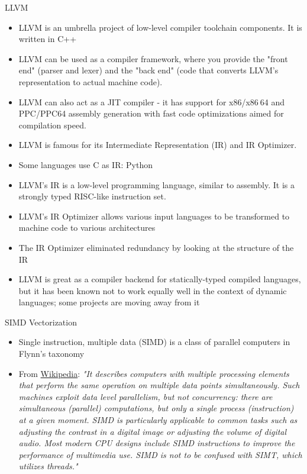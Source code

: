 \documentclass{beamer}
\begin{document}
\begin{darkframes}
\begin{frame}{LLVM}
  \begin{itemize}
  \item LLVM is an umbrella project of low-level compiler toolchain components. It is written in C++  
  \item LLVM can be used as a compiler framework, where you provide the "front end" (parser and lexer) and the "back end" (code that converts LLVM's representation to actual machine code).
  \item LLVM can also act as a JIT compiler - it has support for x86/x86$_{\ }$64 and PPC/PPC64 assembly generation with fast code optimizations aimed for compilation speed.
  \item LLVM is famous for its Intermediate Representation (IR) and IR Optimizer.
  \item Some languages use C as IR: Python
  \item LLVM's IR is a low-level programming language, similar to assembly. It is a strongly typed RISC-like instruction set.
  \item LLVM's IR Optimizer allows various input languages to be transformed to machine code to various architectures
  \item The IR Optimizer eliminated redundancy by looking at the structure of the IR
  \item LLVM is great as a compiler backend for statically-typed compiled languages, but it has been known not to work equally well in the context of dynamic languages; some projects are moving away from it      
  \end{itemize}
  \addtocounter{framenumber}{-1}
\end{frame}
 
\begin{frame}{SIMD Vectorization}
  \begin{itemize}
  \item Single instruction, multiple data (SIMD) is a class of parallel computers in Flynn's taxonomy
  \item From \href{https://en.wikipedia.org/wiki/SIMD}{Wikipedia}: \emph{"It describes computers with multiple processing elements that perform the same operation on multiple data points simultaneously. Such machines exploit data level parallelism, but not concurrency: there are simultaneous (parallel) computations, but only a single process (instruction) at a given moment. SIMD is particularly applicable to common tasks such as adjusting the contrast in a digital image or adjusting the volume of digital audio. Most modern CPU designs include SIMD instructions to improve the performance of multimedia use. SIMD is not to be confused with SIMT, which utilizes threads."} 
  \end{itemize}
  \addtocounter{framenumber}{-1}
\end{frame}

\end{darkframes}
\end{document}
